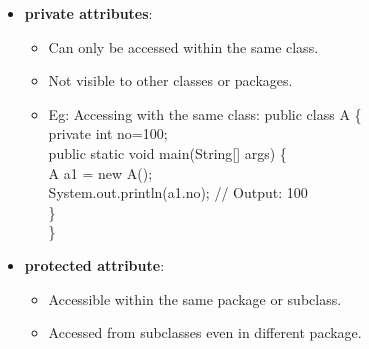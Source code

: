 \begin{flushleft}
\begin{itemize}
\begin{itemize}
			\bigskip
			
			\bigskip
		\end{itemize}
	
		\newpage
		\item \textbf{private attributes}:
		\begin{itemize}
			\item  Can only be accessed within the same class. 
			\item Not visible to other classes or packages.
			\item Eg: Accessing with the same class:
			\bigskip
			 { 
				public class A \{ \\
				\s	private int no=100; \\
				\s	public static void main(String[] args) \{ \\
				\s \s	A a1 = new A(); \\
				\s \s	System.out.println(a1.no); // Output: 100 \\
				\s	\} \\
				\}
			}
		\end{itemize}
	
		\item \textbf{protected attribute}:
		\begin{itemize}
			\item Accessible within the same package or subclass. 
			\item Accessed from subclasses even in different package.
			

\end{itemize}
\end{itemize}
\end{flushleft}
